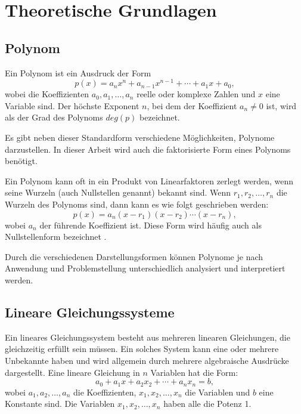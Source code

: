 \chapter{Theoretische Grundlagen}\label{ch:foundation}

\section{Polynom}\label{sec:polynom}

Ein Polynom ist ein Ausdruck der Form
\[
p(x) = a_n x^n + a_{n-1} x^{n-1} + \cdots + a_1 x + a_0,
\]
wobei die Koeffizienten \( a_0, a_1, \ldots, a_n \) reelle oder komplexe Zahlen und \( x \) eine Variable sind. 
Der höchste Exponent \( n \), bei dem der Koeffizient \( a_n \neq 0 \) ist, wird als der Grad des Polynoms $deg(p)$ bezeichnet.

Es gibt neben dieser Standardform verschiedene Möglichkeiten, Polynome darzustellen. 
In dieser Arbeit wird auch die faktorisierte Form eines Polynoms benötigt.

Ein Polynom kann oft in ein Produkt von Linearfaktoren zerlegt werden, wenn seine Wurzeln (auch Nullstellen genannt) bekannt sind. Wenn \( r_1, r_2, \ldots, r_n \) die Wurzeln des Polynoms sind, dann kann es wie folgt geschrieben werden:
\[
p(x) = a_n (x - r_1)(x - r_2) \cdots (x - r_n),
\]
wobei \( a_n \) der führende Koeffizient ist.
Diese Form wird häufig auch als Nullstellenform bezeichnet \cite[Kapitel 49]{weitzKonkreteMathematikNicht2021}.


Durch die verschiedenen Darstellungsformen können Polynome je nach Anwendung und Problemstellung unterschiedlich analysiert und interpretiert werden.

\section{Lineare Gleichungssysteme}\label{sec:equationSystem}

Ein lineares Gleichungssystem besteht aus mehreren linearen Gleichungen, die gleichzeitig erfüllt sein müssen. 
Ein solches System kann eine oder mehrere Unbekannte haben und wird allgemein durch mehrere algebraische Ausdrücke dargestellt. 
Eine lineare Gleichung in \( n \) Variablen hat die Form:
\[
a_0 + a_1 x + a_2 x_2 + \cdots + a_n x_n = b,
\]
wobei \( a_1, a_2, \ldots, a_n \) die Koeffizienten, \( x_1, x_2, \ldots, x_n \) die Variablen und \( b \) eine Konstante sind. 
Die Variablen \( x_1, x_2, \ldots, x_n \) haben alle die Potenz 1.

